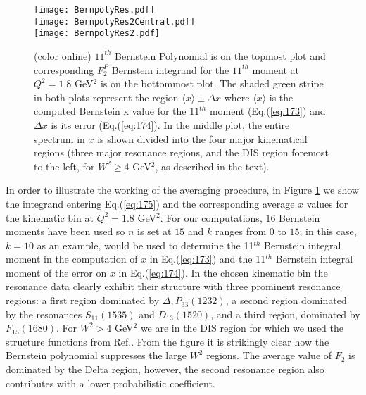 \documentclass[
twocolumn,
aps,prd,
nofootinbib,
superscriptaddress,
showpacs,ligh
tightenlines, 
]{revtex4}
\begin{document}
\begin{figure}
\begin{center}
\texttt{[image: BernpolyRes.pdf]}
\\
\texttt{[image: BernpolyRes2Central.pdf]}
\\
\texttt{[image: BernpolyRes2.pdf]}
\end{center}
\caption{(color online) $11^{th}$ Bernstein Polynomial is on the topmost plot and corresponding  $F_{2}^{P}$ Bernstein integrand for the $11^{th}$ moment  at $Q^{2} = 1.8$ GeV$^{2}$ is on the bottommost plot.  The shaded green stripe in both plots represent the region $\langle x \rangle \pm \Delta x$ where $\langle x \rangle$ is the computed Bernstein x value for the $11^{th}$ moment (Eq.(\ref{eq:173}) and $\Delta x$ is its error (Eq.(\ref{eq:174}).  In the middle plot, the entire spectrum in $x$ is shown divided into the four major kinematical regions (three major resonance regions, and the DIS region foremost to the left, for $W^2 \geq 4$ GeV$^2$, as described in the text).}
\label{fig:BernErrorRegion}
\end{figure}
%
In order to illustrate the working of the averaging procedure, in Figure \ref{fig:BernErrorRegion}
we show the integrand entering Eq.(\ref{eq:175}) and the corresponding average $x$ values for the kinematic bin at $Q^{2} = 1.8$ GeV$^{2}$.  
For our computations, $16$ Bernstein moments have been used so $n$ is set at $15$ and $k$ ranges from $0$ to $15$; in this case, $k=10$ as an example, would be used to determine the 11$^{th}$ Bernstein integral moment in the computation of $x$ in Eq.(\ref{eq:173}) and the 11$^{th}$ Bernstein integral moment of the error on $x$ in Eq.(\ref{eq:174}). 
In the chosen kinematic bin the resonance data clearly exhibit their structure with three prominent resonance regions: a first region dominated by $\Delta, P_{33}(1232)$, a second region dominated by the resonances $S_{11}(1535)$ 
and $D_{13}(1520)$, and a third region, dominated by $F_{15}(1680)$. 
For $W^2 > 4$ GeV$^2$ we are in the DIS region for which we used the structure functions from Ref.\cite{Lai:2010vv}. 
From the figure it is strikingly clear how the Bernstein polynomial suppresses the large $W^2$ regions. The average value of $F_2$ is dominated by the Delta region, however, the second resonance region also contributes with a lower probabilistic coefficient.
\end{document}
